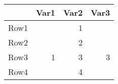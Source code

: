 \begin{tabular}{rrrr}
\hline
 & Var1 & Var2 & Var3 \\ 
\hline
Row1 &  & 1 &  \\ 
Row2 &  & 2 &  \\ 
Row3 & 1 & 3 & 3 \\ 
Row4 &  & 4 &  \\ 
\hline
\end{tabular}%
